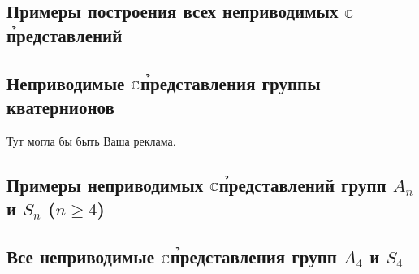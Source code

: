 \subsection{Примеры построения всех неприводимых $\mathbb{C}$\h представлений}
\subsection{Неприводимые $\mathbb{C}$\h представления группы кватернионов}
{\Huge Тут могла бы быть Ваша реклама.}
\subsection{Примеры неприводимых $\mathbb{C}$\h представлений групп $A_n$ и $S_n$ ($n \ge 4$)}
\subsection{Все неприводимые $\mathbb{C}$\h представления групп $A_4$ и $S_4$}
